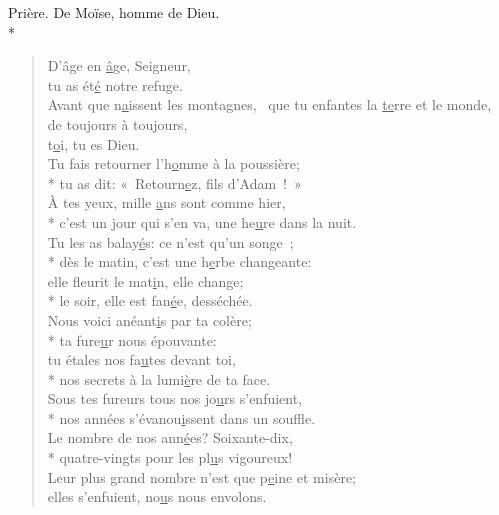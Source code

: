 Prière. De Moïse, homme de Dieu. \\*

\begin{verse}
D’âge en \underline{â}ge, Seigneur, \\
tu as ét\underline{é} notre refuge. \\

Avant que n\underline{a}issent les montagnes,~\psalmdagger
que tu enfantes la \underline{te}rre et le monde,~\psalmstar
de toujours à toujours, \\
t\underline{o}i, tu es Dieu. \\

Tu fais retourner l’h\underline{o}mme à la poussière; \\*
tu as dit: « Retourn\underline{e}z, fils d’Adam ! » \\
À tes yeux, mille \underline{a}ns sont comme hier, \\*
c’est un jour qui s’en va, une he\underline{u}re dans la nuit. \\

Tu les as balay\underline{é}s: ce n’est qu’un songe ; \\*
dès le matin, c’est une h\underline{e}rbe changeante: \\
elle fleurit le mat\underline{i}n, elle change; \\*
le soir, elle est fan\underline{é}e, desséchée. \\

Nous voici anéant\underline{i}s par ta colère; \\*
ta fure\underline{u}r nous épouvante: \\
tu étales nos fa\underline{u}tes devant toi, \\*
nos secrets à la lumi\underline{è}re de ta face. \\

Sous tes fureurs tous nos jo\underline{u}rs s’enfuient, \\*
nos années s’évanou\underline{i}ssent dans un souffle. \\
Le nombre de nos ann\underline{é}es? Soixante-dix, \\*
quatre-vingts pour les pl\underline{u}s vigoureux! \\
Leur plus grand nombre n’est que p\underline{e}ine et misère; \\
elles s’enfuient, no\underline{u}s nous envolons. \\


\end{verse}
